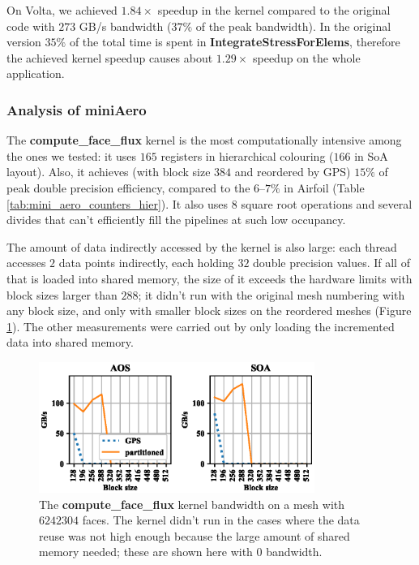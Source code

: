 On Volta, we achieved $1.84\times$ speedup in the kernel compared to the
original code with $273$ GB/s bandwidth ($37\%$ of the peak bandwidth). In the
original version $35\%$ of the total time is spent in
\textbf{IntegrateStressForElems}, therefore the achieved kernel speedup causes
about $1.29\times$ speedup on the whole application.

\subsubsection{Analysis of miniAero}

The \textbf{compute\_face\_flux} kernel is the most computationally intensive
among the ones we tested: it uses $165$ registers in hierarchical  colouring
($166$ in SoA layout). Also, it achieves (with block size $384$ and reordered by
GPS) $15\%$ of peak double precision efficiency, compared to the $6$--$7\%$ in
Airfoil (Table \ref{tab:mini_aero_counters_hier}). It also uses $8$ square root
operations and several divides that can't efficiently fill the pipelines at such
low occupancy.

The amount of data indirectly accessed by the kernel is also large: each thread
accesses $2$ data points indirectly, each holding $32$ double precision values.
If all of that is loaded into shared memory, the size of it exceeds the hardware
limits with block sizes larger than $288$; it didn't run with the original mesh
numbering with any block size, and only with smaller block sizes on the reordered meshes (Figure \ref{fig:mini_aero_bw_crash}). The other measurements were carried out
by only loading the incremented data into shared memory.

\begin{figure}[Htbp]
  \centering
  \includegraphics[width=9cm]{fig/mini_aero_bw_crash.eps}
  \caption{The \textbf{compute\_face\_flux} kernel bandwidth on a mesh with
  $6242304$ faces. The kernel didn't run in the cases where the data reuse was
  not high enough because the large amount of shared memory needed; these are
  shown here with $0$ bandwidth.}
  \label{fig:mini_aero_bw_crash}
\end{figure}

